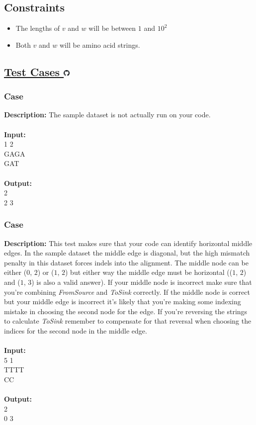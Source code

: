 \documentclass{article}
\newcommand{\code}[1]{{\fontfamily{pcr}\selectfont #1}}
\newcommand{\gitlogo}{\includegraphics[height=12.5]{c0/gitlogo.png}}
\begin{document}
\subsection*{Constraints}
\begin{itemize}
    \item The lengths of $v$ and $w$ will be between $1$ and $10^2$
    \item Both $v$ and $w$ will be amino acid strings.
\end{itemize}
\pagebreak

\subsection*{\href{https://github.com/rjeveloff/BA_problemregister/tree/main/test_cases/chapter_5/5K}{Test Cases \gitlogo}}
\subsubsection*{Case }
\hline \vspace{5}
\textbf{Description:} The sample dataset is not actually run on your code.\\ \\
\noindent \textbf{Input:}\\
\code{1 1 2\\GAGA\\GAT}\\ \\
\noindent \textbf{Output:}\\
\code{2 2\\2 3}

\subsubsection*{Case }
\hline \vspace{5}
\textbf{Description:} This test makes sure that your code can identify horizontal middle edges. In the sample dataset the middle edge is diagonal, but the high mismatch penalty in this dataset forces indels into the alignment. The middle node can be either ($0$, $2$) or ($1$, $2$) but either way the middle edge must be horizontal (($1$, $2$) and ($1$, $3$) is also a valid answer). If your middle node is incorrect make sure that you’re combining \emph{FromSource} and \emph{ToSink} correctly. If the middle node is correct but your middle edge is incorrect it’s likely that you’re making some indexing mistake in choosing the second node for the edge. If you’re reversing the strings to calculate \emph{ToSink} remember to compensate for that reversal when choosing the indices for the second node in the middle edge.\\ \\
\noindent \textbf{Input:}\\
\code{1 5 1\\TTTT\\CC}\\ \\
\noindent \textbf{Output:}\\
\code{0 2\\0 3}
\pagebreak
\end{document}
